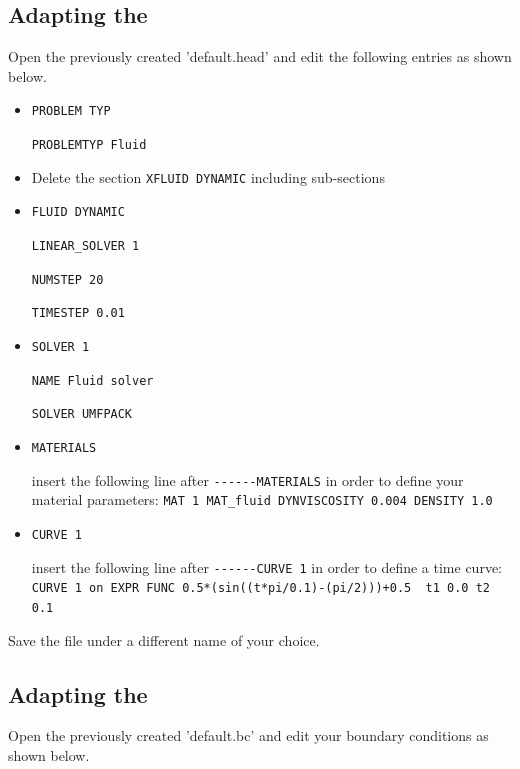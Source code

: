 \subsection{Adapting the \head}
Open the previously created \head 'default.head' and edit the following entries as shown below.
\begin{itemize}
 \item \verb|PROBLEM TYP|

 \verb|PROBLEMTYP Fluid|
 
 \item Delete the section \verb|XFLUID DYNAMIC| including sub-sections
 
 \item \verb|FLUID DYNAMIC|

 \verb|LINEAR_SOLVER 1|

 \verb|NUMSTEP 20|

 \verb|TIMESTEP 0.01|

 \item \verb|SOLVER 1|
 
 \verb|NAME Fluid solver|

 \verb|SOLVER UMFPACK|

 \item \verb|MATERIALS|

 insert the following line after \verb|------MATERIALS| in order to define your material parameters: \newline
 \verb|MAT 1 MAT_fluid DYNVISCOSITY 0.004 DENSITY 1.0|

 \item \verb|CURVE 1|

 insert the following line after \verb|------CURVE 1| in order to define a time curve: \\
 \verb|CURVE 1 on EXPR FUNC 0.5*(sin((t*pi/0.1)-(pi/2)))+0.5  t1 0.0 t2 0.1|
 
\end{itemize}
Save the file under a different name of your choice.

\subsection{Adapting the \bc}
Open the previously created \bc 'default.bc' and edit your boundary conditions as shown below.


